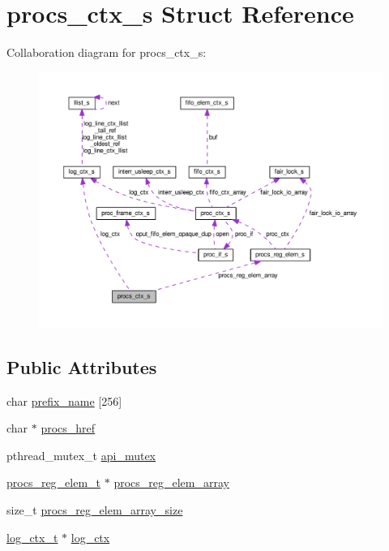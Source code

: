 \hypertarget{structprocs__ctx__s}{}\section{procs\+\_\+ctx\+\_\+s Struct Reference}
\label{structprocs__ctx__s}


Collaboration diagram for procs\+\_\+ctx\+\_\+s\+:\nopagebreak
\begin{figure}[H]
\begin{center}
\leavevmode
\includegraphics[width=350pt]{structprocs__ctx__s__coll__graph}
\end{center}
\end{figure}
\subsection*{Public Attributes}
\begin{DoxyCompactItemize}
\item 
char \hyperlink{structprocs__ctx__s_a00c43e06f8805e3c392802956a3c0fce}{prefix\+\_\+name} \mbox{[}256\mbox{]}
\item 
char $\ast$ \hyperlink{structprocs__ctx__s_adb507582e7611d94d41bfaafd244b99a}{procs\+\_\+href}
\item 
pthread\+\_\+mutex\+\_\+t \hyperlink{structprocs__ctx__s_a27330c986436226abfa1b5a00b7bdeb1}{api\+\_\+mutex}
\item 
\hyperlink{procs_8c_a63a78f7c86536e71715f3fcef28e11c5}{procs\+\_\+reg\+\_\+elem\+\_\+t} $\ast$ \hyperlink{structprocs__ctx__s_a9ad98a927f0a5585076b32faf26a054d}{procs\+\_\+reg\+\_\+elem\+\_\+array}
\item 
size\+\_\+t \hyperlink{structprocs__ctx__s_a083c965ff29e9b8af9215db80cca7c99}{procs\+\_\+reg\+\_\+elem\+\_\+array\+\_\+size}
\item 
\hyperlink{structlog__ctx__s}{log\+\_\+ctx\+\_\+t} $\ast$ \hyperlink{structprocs__ctx__s_ab5d529e82924052baf26478afca901fa}{log\+\_\+ctx}
\end{DoxyCompactItemize}


